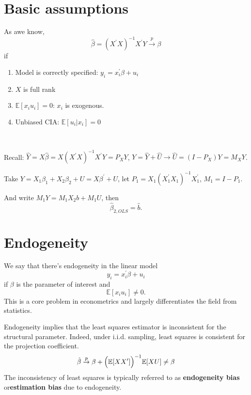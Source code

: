 \section{Basic assumptions}
\label{sec:basic-assumptions}

As awe know, \[
    \hat{\beta} = (X^{\prime} X)^{-1}X^{\prime} Y \overset{p}{\to} \beta
\]
if
\begin{enumerate}
    \item Model is correctly specified: $y_i = x_i^{\prime} \beta + u_i$
    \item $X$ is full rank
    \item $\mathbb{E}[x_i u_i] = 0$: $x_i$ is exogenous.
    \item Unbiased CIA: $\mathbb{E}[u_i|x_i] = 0$
\end{enumerate}

\begin{theorem}
    \label{thm:FWL}
    \ 

    Recall: $\hat{Y} = X \hat{\beta} = X(X^{\prime} X)^{-1}X^{\prime} Y = P_X Y$, $Y = \hat{Y} + \hat{U} \rightarrow \hat{U} = (I - P_X)Y = M_X Y$.

    Take $Y = X_1 \beta_1 + X_2 \beta_2 + U = X \beta ^{\prime} +U$,
    let $P_1 = X_1 (X_1^{\prime} X_1)^{-1}X_1^{\prime} $, $M_1 = I - P_1$.

    And write $M_1 Y = M_1 X_2 b + M_1 U$, then
    \[\hat{\beta}_{2, OLS} = \hat{b}.\]
\end{theorem}

\section{Endogeneity}
\label{sec:endogeneity}

We say that there's endogeneity in the linear model
\[y_i = x_i^{\prime} \beta + u_i\]
if $\beta$ is the parameter of interest and
\[\mathbb{E}[x_i u_i] \neq 0.\]
This is a core problem in econometrics and largely differentiates the field from statistics.

Endogeneity implies that the least squares estimator is inconsistent for the structural parameter.
Indeed, under i.i.d. sampling, least squares is consistent for the projection coefficient.
\begin{gather*}
    \hat{\beta} \overset{p}{\rightarrow} \beta + \Bigl(\mathbb{E}[X X^{\prime}] \Bigr)^{-1} \mathbb{E}[X U] \neq \beta 
\end{gather*}
The inconsistency of least squares is typically referred to as \textbf{endogeneity bias} or\textbf{estimation bias} due to
endogeneity.

